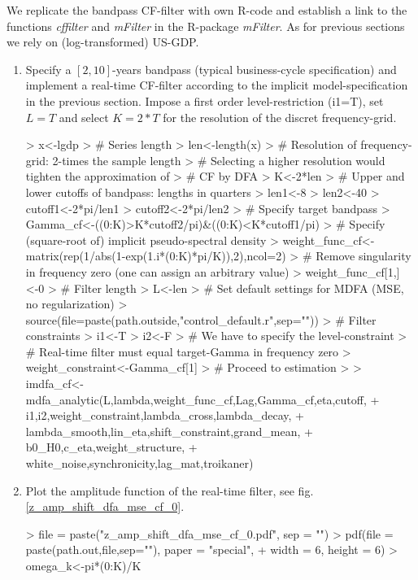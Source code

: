 \documentclass[a4paper]{book}
\begin{document}
We replicate the bandpass CF-filter with own R-code and establish a link to the functions \emph{cffilter} and \emph{mFilter} in the R-package \emph{mFilter}. As for previous sections we rely on (log-transformed) US-GDP.
\begin{enumerate}
\item Specify a $[2,10]$-years bandpass (typical business-cycle specification) and implement a real-time CF-filter according to the implicit model-specification in the previous section. Impose a first order level-restriction (i1=T), set $L=T$ and select $K=2*T$ for the resolution of the discret frequency-grid.
\begin{Schunk}
\begin{Sinput}
> x<-lgdp
> # Series length
> len<-length(x)
> # Resolution of frequency-grid: 2-times the sample length
> #   Selecting a higher resolution would tighten the approximation of 
> #   CF by DFA
> K<-2*len
> # Upper and lower cutoffs of bandpass: lengths in quarters
> len1<-8
> len2<-40
> cutoff1<-2*pi/len1
> cutoff2<-2*pi/len2
> # Specify target bandpass
> Gamma_cf<-((0:K)>K*cutoff2/pi)&((0:K)<K*cutoff1/pi)
> # Specify (square-root of) implicit pseudo-spectral density
> weight_func_cf<-matrix(rep(1/abs(1-exp(1.i*(0:K)*pi/K)),2),ncol=2)
> # Remove singularity in frequency zero (one can assign an arbitrary value)
> weight_func_cf[1,]<-0
> # Filter length
> L<-len
> # Set default settings for MDFA (MSE, no regularization)
> source(file=paste(path.outside,"control_default.r",sep=""))
> # Filter constraints
> i1<-T
> i2<-F
> # We have to specify the level-constraint
> #   Real-time filter must equal target-Gamma in frequency zero
> weight_constraint<-Gamma_cf[1]
> # Proceed to estimation
> 
> imdfa_cf<-mdfa_analytic(L,lambda,weight_func_cf,Lag,Gamma_cf,eta,cutoff,
+                         i1,i2,weight_constraint,lambda_cross,lambda_decay,
+                         lambda_smooth,lin_eta,shift_constraint,grand_mean,
+                         b0_H0,c_eta,weight_structure,
+                         white_noise,synchronicity,lag_mat,troikaner)
\end{Sinput}
\end{Schunk}
\item Plot the amplitude function of the real-time filter, see fig.\ref{z_amp_shift_dfa_mse_cf_0}.
\begin{Schunk}
\begin{Sinput}
> file = paste("z_amp_shift_dfa_mse_cf_0.pdf", sep = "")
> pdf(file = paste(path.out,file,sep=""), paper = "special", 
+     width = 6, height = 6)
> omega_k<-pi*(0:K)/K

\end{Sinput}
\end{Schunk}
\end{enumerate}
\end{document}
